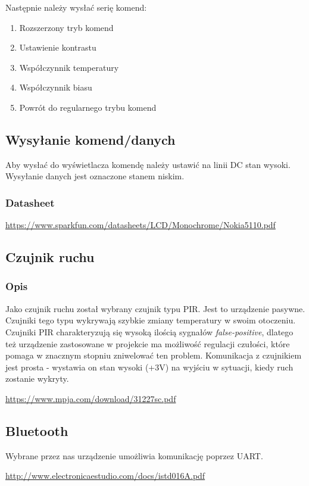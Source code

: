\documentclass{article}
\begin{document}
Następnie należy wysłać serię komend:

\begin{enumerate}
    \item Rozszerzony tryb komend
    \item Ustawienie kontrastu
    \item Współczynnik temperatury
    \item Współczynnik biasu
    \item Powrót do regularnego trybu komend
\end{enumerate}


\subsection{Wysyłanie komend/danych}
Aby wysłać do wyświetlacza komendę należy ustawić na linii DC stan wysoki. Wysyłanie danych
jest oznaczone stanem niskim.
\subsubsection{Datasheet}

\url{https://www.sparkfun.com/datasheets/LCD/Monochrome/Nokia5110.pdf}
\subsection{Czujnik ruchu}

\subsubsection{Opis}
Jako czujnik ruchu został wybrany czujnik typu PIR. Jest to urządzenie pasywne.
Czujniki tego typu wykrywają szybkie zmiany temperatury w swoim otoczeniu. Czujniki
PIR charakteryzują się wysoką ilością sygnałów \emph{false-positive}, dlatego też
urządzenie zastosowane w projekcie ma możliwość regulacji czułości, które pomaga
w znacznym stopniu zniwelować ten problem. Komunikacja z czujnikiem jest prosta - wystawia
on stan wysoki (+3V) na wyjściu w sytuacji, kiedy ruch zostanie wykryty.

\url{https://www.mpja.com/download/31227sc.pdf}
\subsection{Bluetooth}

Wybrane przez nas urządzenie umożliwia komunikację poprzez UART.

\url{http://www.electronicaestudio.com/docs/istd016A.pdf}
\end{document}
